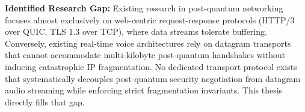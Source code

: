 \textbf{Identified Research Gap:} 
Existing research in post-quantum networking focuses almost exclusively on web-centric request-response protocols (HTTP/3 over QUIC, TLS 1.3 over TCP), where data streams tolerate buffering. Conversely, existing real-time voice architectures rely on datagram transports that cannot accommodate multi-kilobyte post-quantum handshakes without inducing catastrophic IP fragmentation. No dedicated transport protocol exists that systematically decouples post-quantum security negotiation from datagram audio streaming while enforcing strict fragmentation invariants. This thesis directly fills that gap.
